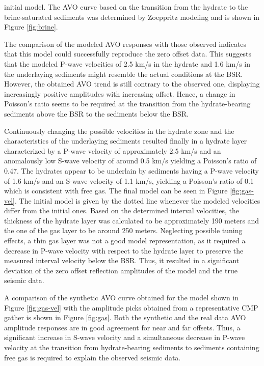 initial model.
The AVO curve based on the transition from the hydrate to the brine-saturated
sediments was determined by Zoeppritz modeling and is shown in
Figure \ref{fig:brine}.
\par
The comparison of the modeled AVO responses with those observed 
indicates that this
model could successfully reproduce the zero offset data. This suggests that the
modeled P-wave velocities of 2.5 km/s in the hydrate and 1.6 km/s in
the underlaying sediments might resemble the actual conditions at the BSR.
However, the obtained AVO trend is still contrary to the observed one,
displaying increasingly positive amplitudes with increasing offset. Hence,
a change in Poisson's ratio seems to be required at the transition from the
hydrate-bearing sediments above the BSR to the sediments below the BSR.
\par
Continuously changing the possible velocities in the hydrate zone and the 
characteristics of the underlaying sediments resulted finally in a hydrate layer
characterized by a P-wave velocity of approximately 2.5 km/s and an anomalously
low S-wave velocity of around 0.5 km/s yielding a Poisson's ratio of 0.47.
The hydrates appear to be underlain by sediments having a 
P-wave velocity of 1.6 km/s and an S-wave velocity of 1.1 km/s, yielding a
Poisson's ratio of 0.1 which is consistent with free gas. The final model can 
be seen in Figure \ref{fig:gas-vel}. The initial model is given by the dotted line
whenever the modeled velocities differ from the initial ones.
Based on the determined interval velocities,
the thickness of the hydrate layer was calculated to be approximately 190
meters and the one of the gas layer to be around 250 meters. Neglecting possible
tuning effects, a thin gas layer was not a good model representation,
as it required a decrease in P-wave velocity with respect to the hydrate
layer to preserve the measured interval velocity below the BSR. Thus, it
resulted in a significant 
deviation of the zero offset reflection amplitudes of the model
and the true seismic data.
\par
A comparison of the synthetic AVO curve obtained for the model shown in
Figure \ref{fig:gas-vel} with the amplitude picks obtained
from a representative CMP gather is shown in Figure \ref{fig:gas}. Both the
synthetic and the real data AVO amplitude responses are in good agreement
for near and far offsets. Thus, a significant increase in S-wave velocity and
a simultaneous decrease in P-wave velocity at the transition from 
hydrate-bearing sediments to sediments containing free gas is required to
explain the observed seismic data. 

